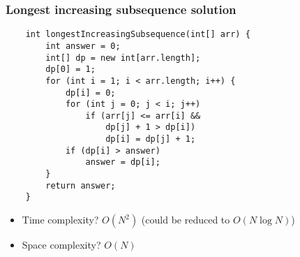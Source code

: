 \documentclass[t]{beamer}
\begin{document}
\begin{frame}[fragile]

    \frametitle{Longest increasing subsequence solution}
    
    \begin{verbatim}
    int longestIncreasingSubsequence(int[] arr) {
        int answer = 0;
        int[] dp = new int[arr.length];
        dp[0] = 1;
        for (int i = 1; i < arr.length; i++) {
            dp[i] = 0;
            for (int j = 0; j < i; j++)
                if (arr[j] <= arr[i] &&
                    dp[j] + 1 > dp[i])
                    dp[i] = dp[j] + 1;
            if (dp[i] > answer)
                answer = dp[i];
        }
        return answer;
    }
    \end{verbatim}

    \pause

    \begin{itemize}

        \item

        Time complexity? \pause $O(N^2)$ \pause (could be reduced to $O(N \log N)$) \pause

        \item

        Space complexity? \pause $O(N)$

    \end{itemize}

\end{frame}
\end{document}

